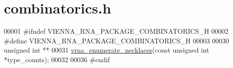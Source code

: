 \hypertarget{combinatorics_8h_source}{}\section{combinatorics.\+h}
\label{combinatorics_8h_source}

\begin{DoxyCode}
00001 \textcolor{preprocessor}{#ifndef VIENNA\_RNA\_PACKAGE\_COMBINATORICS\_H}
00002 \textcolor{preprocessor}{#define VIENNA\_RNA\_PACKAGE\_COMBINATORICS\_H}
00003 
00030 \textcolor{keywordtype}{unsigned} \textcolor{keywordtype}{int} **
00031 \hyperlink{group__utils_gae081ac655a76bd5c4b3d86c60b096b75}{vrna\_enumerate\_necklaces}(\textcolor{keyword}{const} \textcolor{keywordtype}{unsigned} \textcolor{keywordtype}{int} *type\_counts);
00032 
00036 \textcolor{preprocessor}{#endif}
\end{DoxyCode}
